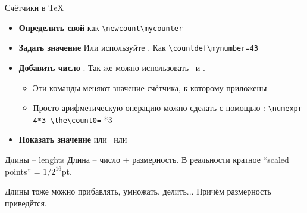 \begin{frame}[fragile]{Счётчики в \TeX}\relax
    \begin{itemize}
        \item \textbf{Определить свой} \ccol\newcount{} как \verb|\newcount\mycounter|
        \item \textbf{Задать значение}   Или используйте \ccol\countdef. Как \footnotesize\verb|\countdef\mynumber=43|
        \item \textbf{Добавить число}  . Так же можно использовать \ccol\multiply\ и \ccol\divide. \begin{itemize}
            \item\footnotesize Эти команды меняют значение счётчика, к которому приложены
            \item\footnotesize Просто арифметическую операцию можно сделать с помощью \ccol\numexpr: \verb|\numexpr 4*3-\the\count0=| \the{}*3-\the{}\relax
        \end{itemize}
        \item \textbf{Показать значение}  или \ccol\number\ или \ccol\romannumeral
         
    \end{itemize}
     
     
     
\end{frame}


\begin{frame}{Длины -- lenghts}\relax
    Длина -- число + размерность. В реальности кратное ``scaled points'' = $1/2^{16}$pt.
    
    Длины тоже можно прибавлять, умножать, делить... Причём размерность приведётся.
\end{frame}

